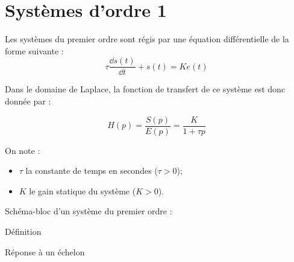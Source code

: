 \documentclass[10pt,fleqn]{article} %
\begin{document}

\vspace{2cm}
\pagestyle{fancy}
\thispagestyle{plain}

\section{Systèmes d'ordre 1}




\begin{defi}

Les systèmes du premier ordre sont régis par une équation différentielle de la
forme suivante :
$$
\tau \dfrac{\dd s(t)}{\dd t}+s(t) = Ke(t)
$$

\begin{minipage}[c]{.6\linewidth}
Dans le domaine de Laplace, la fonction de transfert de ce système est donc
donnée par :

$$
H(p)=\dfrac{S(p)}{E(p)} = \dfrac{K}{1+\tau p}
$$

On note :
\begin{itemize}
 \item $\tau$ la constante de temps en secondes ($\tau>0$);
\item $K$ le gain statique du système ($K>0$).
\end{itemize}
\end{minipage}\hfill
\begin{minipage}[c]{.35\linewidth}
Schéma-bloc d'un système du premier ordre :

\begin{center}
\end{center}
\end{minipage}
\end{defi}


Définition

Réponse à un échelon 
\end{document}
